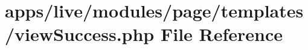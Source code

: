 \hypertarget{live_2modules_2page_2templates_2view_success_8php}{\section{apps/live/modules/page/templates/view\-Success.php File Reference}
\label{live_2modules_2page_2templates_2view_success_8php}
}
